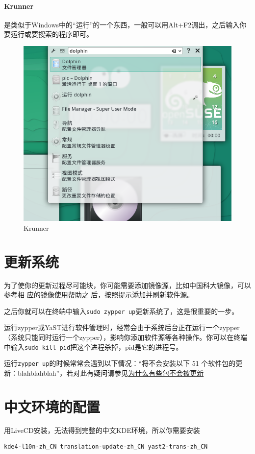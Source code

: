 \documentclass[11pt,openany]{book}
\newcommand{\command}[1]{\texttt{\textcolor{codec}{#1}}}
\newcommand{\zy}{zypper或YaST}
\begin{document}
\paragraph{Krunner} 是类似于Windows中的“运行”的一个东西，一般可以用Alt+F2调出，之后输入你要运行或要搜索的程序即可。
\begin{figure}[htbp!]
\centering
\includegraphics[width=\textwidth]{./pic/krunner.png} 
\caption{Krunner}
\end{figure}

\section{更新系统}
为了使你的更新过程尽可能块，你可能需要添加镜像源，比如中国科大镜像，可以参考相
应的\href{https://lug.ustc.edu.cn/wiki/mirrors/help/opensuse}{镜像使用帮助}之
后，按照提示添加并刷新软件源。

之后你就可以在终端中输入\command{sudo zypper up}更新系统了，这是很重要的一步。

运行\zy 进行软件管理时，经常会由于系统后台正在运行一个zypper（系统只能同时运行一个zypper），影响你添加软件源等各种操作。你可以在终端中输入\command{sudo kill pid}把这个进程杀掉，pid是它的进程号。

运行\command{zypper up}的时候常常会遇到以下情况：“将不会安装以下 51 个软件包的更新：blahblahblah”，若对此有疑问请参见\href{https://forum.suse.org.cn/viewtopic.php?t=2777&p=21896}{为什么有些包不会被更新}
\section{中文环境的配置}
用LiveCD安装，无法得到完整的中文KDE环境，所以你需要安装
\begin{Verbatim}[formatcom=\color{codec}]
    kde4-l10n-zh_CN translation-update-zh_CN yast2-trans-zh_CN
\end{Verbatim}
\end{document}
